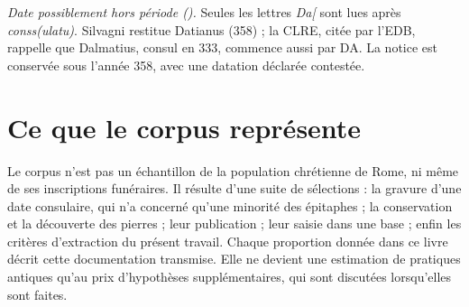 \emph{Date possiblement hors période ().} Seules les lettres \emph{Da[} sont lues après \emph{conss(ulatu)}. Silvagni restitue Datianus (358) ; la CLRE, citée par l’EDB, rappelle que Dalmatius, consul en 333, commence aussi par DA. La notice est conservée sous l’année 358, avec une datation déclarée contestée.

\section{Ce que le corpus représente}

Le corpus n’est pas un échantillon de la population chrétienne de Rome, ni même de ses inscriptions funéraires. Il résulte d’une suite de sélections : la gravure d’une date consulaire, qui n’a concerné qu’une minorité des épitaphes ; la conservation et la découverte des pierres ; leur publication ; leur saisie dans une base ; enfin les critères d’extraction du présent travail. Chaque proportion donnée dans ce livre décrit cette documentation transmise. Elle ne devient une estimation de pratiques antiques qu’au prix d’hypothèses supplémentaires, qui sont discutées lorsqu’elles sont faites.
